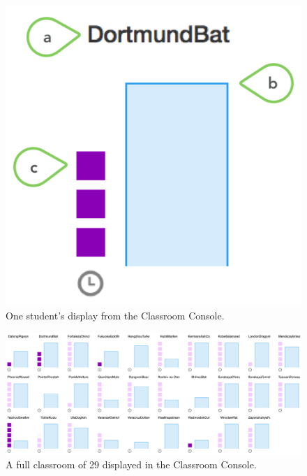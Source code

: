 \begin{figure}
  \centering
      \includegraphics{images/ch4-console-single-annotated}
  \caption[One student display, annotated]{One student's display from the Classroom Console. }
  \label{fig:console-single-annotated}
\end{figure}


\begin{figure}
  \centering
      \includegraphics[width=\textwidth]{images/ch4-console-class}
  \caption[Full classroom display of the Classroom Console]{A full classroom of 29 displayed in the Classroom Console.}
  \label{fig:console-classroom}
\end{figure}

